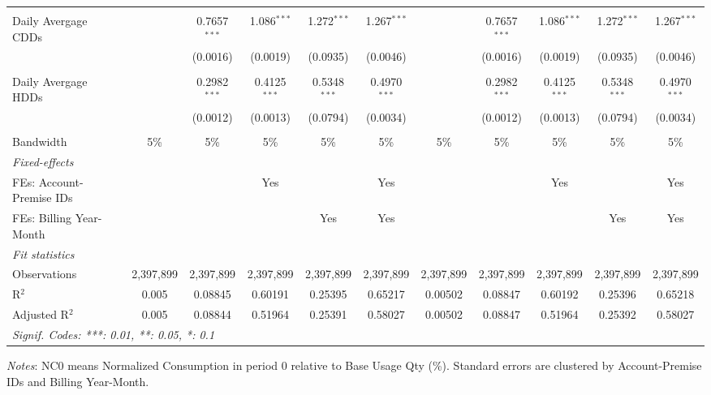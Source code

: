 \begin{table}[htbp]
\begin{adjustbox}{scale = 0.75}
\begin{tabular}{lcccccccccc}
&   &   &   &   &   &   &   &   &   &  \\
Daily Avergage CDDs&   & 0.7657$^{***}$ & 1.086$^{***}$ & 1.272$^{***}$ & 1.267$^{***}$ &    & 0.7657$^{***}$ & 1.086$^{***}$ & 1.272$^{***}$ & 1.267$^{***}$\\
  &   & (0.0016) & (0.0019) & (0.0935) & (0.0046) &    & (0.0016) & (0.0019) & (0.0935) & (0.0046)\\
&   &   &   &   &   &   &   &   &   &  \\
Daily Avergage HDDs&   & 0.2982$^{***}$ & 0.4125$^{***}$ & 0.5348$^{***}$ & 0.4970$^{***}$ &    & 0.2982$^{***}$ & 0.4125$^{***}$ & 0.5348$^{***}$ & 0.4970$^{***}$\\
  &   & (0.0012) & (0.0013) & (0.0794) & (0.0034) &    & (0.0012) & (0.0013) & (0.0794) & (0.0034)\\
&   &   &   &   &   &   &   &   &   &  \\
\midrule Bandwidth & 5\% & 5\% & 5\% & 5\% & 5\% & 5\% & 5\% & 5\% & 5\% & 5\%\\
\midrule
\emph{Fixed-effects}&   &   &   &   &   &   &   &   &   &  \\
FEs: Account-Premise IDs &  &  & Yes &  & Yes &  &  & Yes &  & Yes\\
FEs: Billing Year-Month &  &  &  & Yes & Yes &  &  &  & Yes & Yes\\
\midrule
\emph{Fit statistics}&  & & & & & & & & & \\
Observations & 2,397,899&2,397,899&2,397,899&2,397,899&2,397,899&2,397,899&2,397,899&2,397,899&2,397,899&2,397,899\\
R$^2$ & 0.005&0.08845&0.60191&0.25395&0.65217&0.00502&0.08847&0.60192&0.25396&0.65218\\
Adjusted R$^2$ & 0.005&0.08844&0.51964&0.25391&0.58027&0.00502&0.08847&0.51964&0.25392&0.58027\\
\bottomrule\bottomrule
\multicolumn{11}{l}{\emph{Signif. Codes: ***: 0.01, **: 0.05, *: 0.1}}\\
\end{tabular}
\end{adjustbox}
\begin{tablenotes}
\footnotesize
\emph{\medskip Notes}: NC0 means Normalized Consumption in period 0 relative to Base Usage Qty (\%). Standard errors are clustered by Account-Premise IDs and Billing Year-Month.
\end{tablenotes}
\end{table}